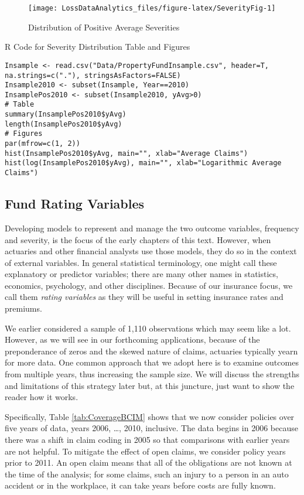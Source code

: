\documentclass[]{book}
\theoremstyle{definition}
\theoremstyle{definition}
\theoremstyle{definition}
\theoremstyle{remark}
\begin{document}
\begin{figure}

{\centering \texttt{[image: LossDataAnalytics\_files/figure-latex/SeverityFig-1]} 

}

\caption{Distribution of Positive Average Severities}\label{fig:SeverityFig}
\end{figure}

R Code for Severity Distribution Table and Figures

\hypertarget{display.SeverityFig.2}{}
\begin{verbatim}
Insample <- read.csv("Data/PropertyFundInsample.csv", header=T, na.strings=c("."), stringsAsFactors=FALSE)
Insample2010 <- subset(Insample, Year==2010)
InsamplePos2010 <- subset(Insample2010, yAvg>0)
# Table
summary(InsamplePos2010$yAvg)
length(InsamplePos2010$yAvg)
# Figures
par(mfrow=c(1, 2))
hist(InsamplePos2010$yAvg, main="", xlab="Average Claims")
hist(log(InsamplePos2010$yAvg), main="", xlab="Logarithmic Average Claims")
\end{verbatim}

\subsection{Fund Rating Variables}\label{S:FundVariables}

Developing models to represent and manage the two outcome variables,
frequency and severity, is the focus of the early chapters of this text.
However, when actuaries and other financial analysts use those models,
they do so in the context of external variables. In general statistical
terminology, one might call these explanatory or predictor variables;
there are many other names in statistics, economics, psychology, and
other disciplines. Because of our insurance focus, we call them
\emph{rating variables} as they will be useful in setting insurance
rates and premiums.

We earlier considered a sample of 1,110 observations which may seem like
a lot. However, as we will see in our forthcoming applications, because
of the preponderance of zeros and the skewed nature of claims, actuaries
typically yearn for more data. One common approach that we adopt here is
to examine outcomes from multiple years, thus increasing the sample
size. We will discuss the strengths and limitations of this strategy
later but, at this juncture, just want to show the reader how it works.

Specifically, Table \ref{tab:CoverageBCIM} shows that we now consider
policies over five years of data, years 2006, \ldots{}, 2010, inclusive.
The data begins in 2006 because there was a shift in claim coding in
2005 so that comparisons with earlier years are not helpful. To mitigate
the effect of open claims, we consider policy years prior to 2011. An
open claim means that all of the obligations are not known at the time
of the analysis; for some claims, such an injury to a person in an auto
accident or in the workplace, it can take years before costs are fully
known.
\end{document}
